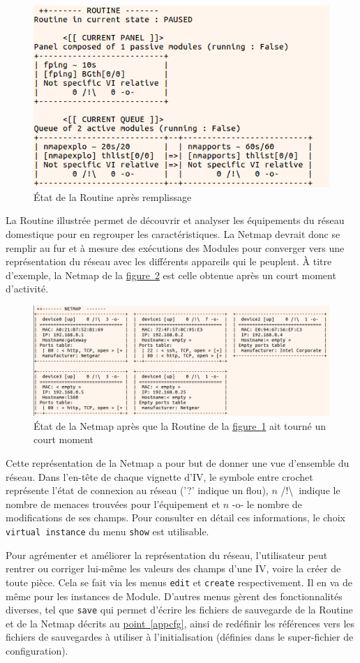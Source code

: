 \documentclass[]{article}
\newcommand{\wordlink}[2]{\hyperref[#1]{#2~\ref{#1}}}
\begin{document}
\begin{figure}[!ht]
\centering
     \includegraphics[width=0.5\linewidth]{vueroutine}
     \caption{État de la Routine après remplissage}
     \label{vueroutine}
\end{figure}

La Routine illustrée permet de découvrir et analyser les équipements du réseau domestique pour en regrouper les caractéristiques. La Netmap devrait donc se remplir au fur et à mesure des exécutions des Modules pour converger vers une représentation du réseau avec les différents appareils qui le peuplent. À titre d'exemple, la Netmap de la \wordlink{vuenetmap}{figure} est celle obtenue après un court moment d'activité.


\begin{figure}[!ht]
\centering
     \includegraphics[width=0.8\linewidth]{vuenetmap}
     \caption{État de la Netmap après que la Routine de la \wordlink{vueroutine}{figure} ait tourné un court moment}
     \label{vuenetmap}
\end{figure}

\par Cette représentation de la Netmap a pour but de donner une vue d'ensemble du réseau. Dans l'en-tête de chaque vignette d'IV, le symbole entre crochet représente l'état de connexion au réseau ('?' indique un flou), $n$ /!\textbackslash $\:$  indique le nombre de menaces trouvées pour l'équipement et $n$ -o- le nombre de modifications de ses champs. Pour consulter en détail ces informations, le choix \texttt{virtual instance} du menu \texttt{show} est utilisable.\\

\par Pour agrémenter et améliorer la représentation du réseau, l'utilisateur peut rentrer ou corriger lui-même les valeurs des champs d'une IV, voire la créer de toute pièce. Cela se fait via les menus \texttt{edit} et \texttt{create} respectivement. Il en va de même pour les instances de Module. D'autres menus gèrent des fonctionnalités diverses, tel que \texttt{save} qui permet d'écrire les fichiers de sauvegarde de la Routine et de la Netmap décrits au \wordlink{appcfg}{point}, ainsi de redéfinir les références vers les fichiers de sauvegardes à utiliser à l'initialisation (définies dans le super-fichier de configuration). 
\end{document}
